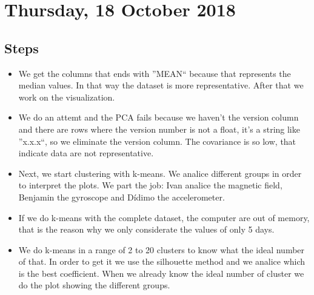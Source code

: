 \section{Thursday, 18 October 2018}

\subsection{Steps}
\begin{itemize}
\item We get the columns that ends with ''MEAN`` because that represents the median values. In that way the dataset is more representative. After that we work on the visualization.
\item We do an attemt and the PCA fails because we haven't the version column and there are rows where the version number is not a float, it's a string like ''x.x.x``, so we eliminate the version column.
The covariance is so low, that indicate data are not representative.
\item Next, we start clustering with k-means. We analice different groups in order to interpret the plots. We part the job: Ivan analice the magnetic field, Benjamin the gyroscope and Dídimo the accelerometer.
\item If we do k-means with the complete dataset, the computer are out of memory, that is the reason why we only considerate the values of only 5 days.
\item We do k-means in a range of 2 to 20 clusters to know what the ideal number of that. In order to get it we use the silhouette method and we analice which is the best coefficient. When we already know the ideal number of cluster we do the plot showing the different groups. 
\end{itemize}
